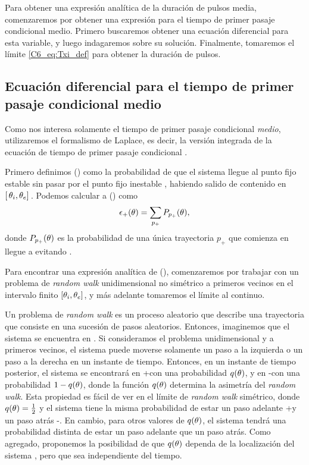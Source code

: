 \documentclass[./main.tex]{subfiles}
\begin{document}
Para obtener una expresión analítica de la duración de pulsos media, comenzaremos por obtener una expresión para el tiempo de primer pasaje condicional medio. Primero buscaremos obtener una ecuación diferencial para esta variable, y luego indagaremos sobre su solución. Finalmente, tomaremos el límite \ref{C6_eq:Txi_def} para obtener la duración de pulsos.

\subsection{Ecuación diferencial para el tiempo de primer pasaje condicional medio}

Como nos interesa solamente el tiempo de primer pasaje condicional \emph{medio}, utilizaremos el formalismo de Laplace, es decir, la versión integrada de la ecuación de tiempo de primer pasaje condicional \cite{Redner2001}.

Primero definimos \epsplus(\xx) como la probabilidad de que el sistema llegue al punto fijo estable \xxe sin pasar por el punto fijo inestable \xxi, habiendo salido de \xx contenido en $[ \,\theta_i,\theta_e ]\,$. Podemos calcular a \epsplus(\xx) como
\begin{equation}
    \epsilon_{+}(\theta) = \sum_{p_{+}} P_{p_{+}}(\theta),
    \label{C6_eq:mFPT_eps_def}
\end{equation}
donde $P_{p_{+}}(\theta)$ es la probabilidad de una única trayectoria $p_{+}$ que comienza en \xx llegue a \xxe evitando \xxi. 

Para encontrar una expresión analítica de \epsplus(\xx), comenzaremos por trabajar con un problema de \textit{random walk} unidimensional no simétrico a primeros vecinos en el intervalo finito $[\theta_i,\theta_e ]$, y más adelante tomaremos el límite al continuo. 


Un problema de \textit{random walk} es un proceso aleatorio que describe una trayectoria que consiste en una sucesión de pasos aleatorios. Entonces, imaginemos que el sistema se encuentra en \xx. Si consideramos el problema unidimensional y a primeros vecinos, el sistema puede moverse solamente un paso a la izquierda o un paso a la derecha en un instante de tiempo. Entonces, en un instante de tiempo posterior, el sistema se encontrará en \xx+\deltax con una probabilidad $q(\theta)$, y en \xx-\deltax con una probabilidad $1-q(\theta)$, donde la función $q(\theta)$ determina la asimetría del \textit{random walk}. Esta propiedad es fácil de ver en el límite de \textit{random walk} simétrico, donde $q(\theta) = \frac{1}{2}$ y el sistema tiene la misma probabilidad de estar un paso adelante \xx+\deltax y un paso atrás \xx-\deltax. En cambio, para otros valores de $q(\theta)$, el sistema tendrá una probabilidad distinta de estar un paso adelante que un paso atrás. Como agregado, proponemos la posibilidad de que $q(\theta)$ dependa de la localización del sistema \xx, pero que sea independiente del tiempo. 
\end{document}

